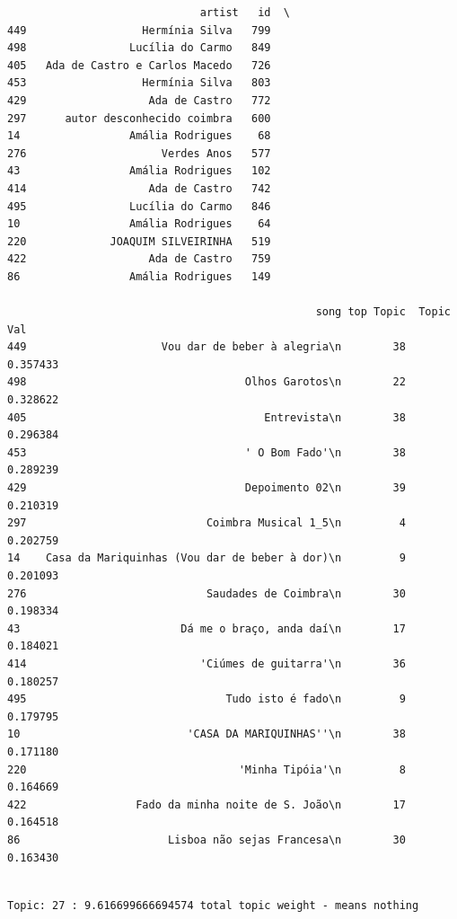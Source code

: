 \documentclass[11pt]{article}
\begin{document}
    
    \begin{verbatim}
                              artist   id  \
449                  Hermínia Silva   799   
498                Lucília do Carmo   849   
405   Ada de Castro e Carlos Macedo   726   
453                  Hermínia Silva   803   
429                   Ada de Castro   772   
297      autor desconhecido coimbra   600   
14                 Amália Rodrigues    68   
276                     Verdes Anos   577   
43                 Amália Rodrigues   102   
414                   Ada de Castro   742   
495                Lucília do Carmo   846   
10                 Amália Rodrigues    64   
220             JOAQUIM SILVEIRINHA   519   
422                   Ada de Castro   759   
86                 Amália Rodrigues   149   

                                                song top Topic  Topic Val  
449                     Vou dar de beber à alegria\n        38   0.357433  
498                                  Olhos Garotos\n        22   0.328622  
405                                     Entrevista\n        38   0.296384  
453                                  ' O Bom Fado'\n        38   0.289239  
429                                  Depoimento 02\n        39   0.210319  
297                            Coimbra Musical 1_5\n         4   0.202759  
14    Casa da Mariquinhas (Vou dar de beber à dor)\n         9   0.201093  
276                            Saudades de Coimbra\n        30   0.198334  
43                         Dá me o braço, anda daí\n        17   0.184021  
414                           'Ciúmes de guitarra'\n        36   0.180257  
495                               Tudo isto é fado\n         9   0.179795  
10                          'CASA DA MARIQUINHAS''\n        38   0.171180  
220                                 'Minha Tipóia'\n         8   0.164669  
422                 Fado da minha noite de S. João\n        17   0.164518  
86                       Lisboa não sejas Francesa\n        30   0.163430  
    \end{verbatim}

    
    \begin{Verbatim}[commandchars=\\\{\}]

Topic: 27 : 9.616699666694574 total topic weight - means nothing

    \end{Verbatim}
\end{document}
